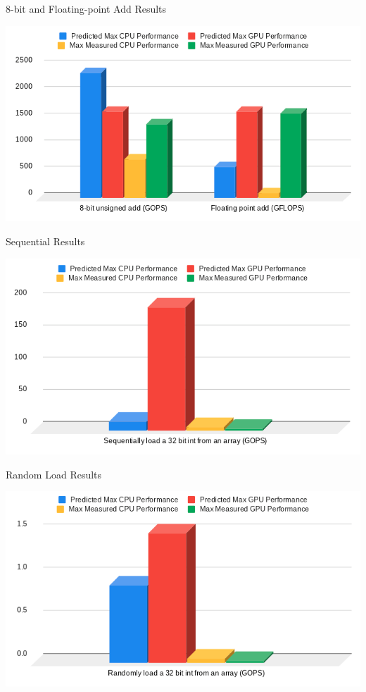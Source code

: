 \begin{frame}{8-bit and Floating-point Add Results}

\begin{center}
\includegraphics[width=1\textwidth]{add.png}
\end{center}
\end{frame}

\begin{frame}{Sequential Results}
\begin{center}
\includegraphics[width=1\textwidth]{sequential.png}
\end{center}
\end{frame}

\begin{frame}{Random Load Results}
\begin{center}
\includegraphics[width=1\textwidth]{random.png}
\end{center}
\end{frame}
